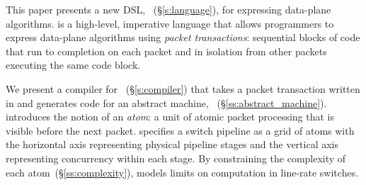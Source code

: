 


This paper presents a new DSL, \pktlanguage~(\S\ref{s:language}), for
expressing data-plane algorithms. \pktlanguage is a high-level, imperative
language that allows programmers to express data-plane algorithms using {\em
packet transactions}: sequential blocks of code that run to completion on each
packet and in isolation from other packets executing the same code block.

We present a compiler for \pktlanguage~(\S\ref{s:compiler}) that takes a packet
transaction written in \pktlanguage and generates code for an abstract machine,
\absmachine~(\S\ref{ss:abstract_machine}). \absmachine introduces the notion of
an \textit{atom}: a unit of atomic packet processing that is visible before the
next packet. \absmachine specifies a switch pipeline as a grid of atoms with
the horizontal axis representing physical pipeline stages and the vertical axis
representing concurrency within each stage. By constraining the complexity of
each atom~(\S\ref{ss:complexity}), \absmachine models limits on computation in
line-rate switches.

